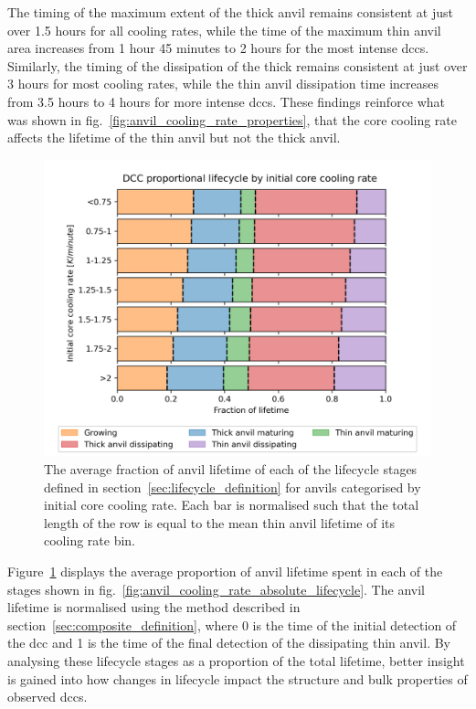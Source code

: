 The timing of the maximum extent of the thick anvil remains consistent at just over 1.5 hours for all cooling rates, while the time of the maximum thin anvil area increases from 1 hour 45 minutes to 2 hours for the most intense \acrshort{dcc}s.
Similarly, the timing of the dissipation of the thick remains consistent at just over 3 hours for most cooling rates, while the thin anvil dissipation time increases from 3.5 hours to 4 hours for more intense \acrshort{dcc}s.
These findings reinforce what was shown in fig.~\ref{fig:anvil_cooling_rate_properties}, that the core cooling rate affects the lifetime of the thin anvil but not the thick anvil.

\begin{figure}[tp]
    \centering
    \includegraphics[width=\textwidth]{figures/chapter3_10.png}
    \caption[
    The average fraction of anvil lifetime of each lifecycle stage for anvils categorised by initial core cooling rate
    ]{
    The average fraction of anvil lifetime of each of the lifecycle stages defined in section~\ref{sec:lifecycle_definition} for anvils categorised by initial core cooling rate. Each bar is normalised such that the total length of the row is equal to the mean thin anvil lifetime of its cooling rate bin.
    }
    \label{fig:anvil_cooling_rate_proportional_lifecycle}
\end{figure}

Figure~\ref{fig:anvil_cooling_rate_proportional_lifecycle} displays the average proportion of anvil lifetime spent in each of the stages shown in fig.~\ref{fig:anvil_cooling_rate_absolute_lifecycle}.
The anvil lifetime is normalised using the method described in section~\ref{sec:composite_definition}, where 0 is the time of the initial detection of the \acrshort{dcc} and 1 is the time of the final detection of the dissipating thin anvil.
By analysing these lifecycle stages as a proportion of the total lifetime, better insight is gained into how changes in lifecycle impact the structure and bulk properties of observed \acrshort{dcc}s.

